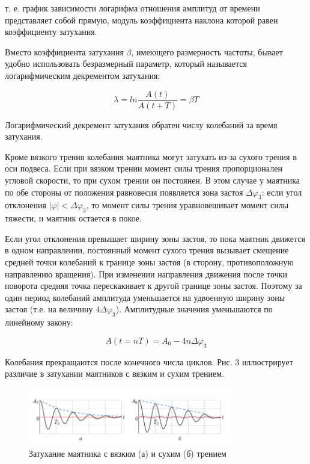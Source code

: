 \documentclass[a4paper]{article}
\begin{document}
т. е. график зависимости логарифма отношения амплитуд от времени представляет собой прямую, модуль коэффициента наклона которой равен коэффициенту затухания.

Вместо коэффициента затухания $\beta$, имеющего размерность частоты, бывает удобно использовать безразмерный параметр, который называется логарифмическим декрементом затухания:

\begin{equation}
\lambda = ln\frac{A(t)}{A(t + T)} = \beta T
\end{equation}

Логарифмический декремент затухания обратен числу колебаний за время затухания.

Кроме вязкого трения колебания маятника могут затухать из-за сухого трения в оси подвеса. Если при вязком трении момент силы трения пропорционален угловой скорости, то при сухом трении он постоянен. В этом случае у маятника по обе стороны от положения равновесия появляется зона застоя $\Delta \varphi_3$: если угол отклонения $|\varphi| < \Delta \varphi_3$, то момент силы трения уравновешивает момент силы тяжести, и маятник остается в покое.

Если угол отклонения превышает ширину зоны застоя, то пока маятник движется в одном направлении, постоянный момент сухого трения вызывает смещение средней точки колебаний к границе зоны застоя (в сторону, противоположную направлению вращения). При изменении направления движения после точки поворота средняя точка перескакивает к другой границе зоны застоя. Поэтому за один период колебаний амплитуда уменьшается на удвоенную ширину зоны застоя (т.е. на величину $4\Delta \varphi_3$). Амплитудные значения уменьшаются по линейному закону:

\[
A(t = nT) = A_0 - 4n\Delta \varphi_3
\]

Колебания прекращаются после конечного числа циклов. Рис. 3 иллюстрирует различие в затухании маятников с вязким и сухим трением.

\begin{figure}[h]
\centering
\includegraphics[width=0.8\textwidth]{3.png}
\caption{Затухание маятника с вязким (а) и сухим (б) трением}
\end{figure}
\end{document}
